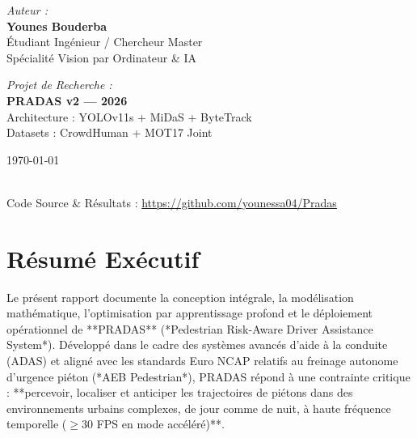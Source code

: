 \documentclass[11pt,a4paper]{article}
\begin{document}
\begin{titlepage}
    \begin{minipage}{0.48\textwidth}
        \begin{flushleft} \large
            \emph{Auteur :}\\
            \textbf{Younes Bouderba}\\
            \small Étudiant Ingénieur / Chercheur Master\\
            \small Spécialité Vision par Ordinateur \& IA
        \end{flushleft}
    \end{minipage}
    \hfill
    \begin{minipage}{0.48\textwidth}
        \begin{flushright} \large
            \emph{Projet de Recherche :}\\
            \textbf{PRADAS v2 — 2026}\\
            \small Architecture : YOLOv11s + MiDaS + ByteTrack\\
            \small Datasets : CrowdHuman + MOT17 Joint
        \end{flushright}
    \end{minipage}
    
    \vfill
    
    {\large \today}\par
    \hrulefill\\
    \footnotesize Code Source \& Résultats : \url{https://github.com/younessa04/Pradas}
\end{titlepage}

\newpage
\tableofcontents
\newpage

\section*{Résumé Exécutif}

Le présent rapport documente la conception intégrale, la modélisation mathématique, l'optimisation par apprentissage profond et le déploiement opérationnel de **PRADAS** (*Pedestrian Risk-Aware Driver Assistance System*). Développé dans le cadre des systèmes avancés d'aide à la conduite (ADAS) et aligné avec les standards Euro NCAP relatifs au freinage autonome d'urgence piéton (*AEB Pedestrian*), PRADAS répond à une contrainte critique : **percevoir, localiser et anticiper les trajectoires de piétons dans des environnements urbains complexes, de jour comme de nuit, à haute fréquence temporelle ($\ge 30$ FPS en mode accéléré)**.
\end{document}
